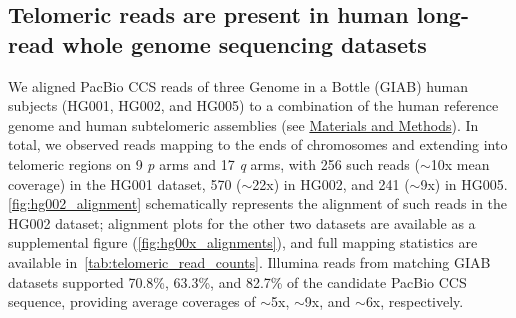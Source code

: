 \documentclass{article}
\begin{document}
\subsection*{Telomeric reads are present in human long-read whole genome sequencing datasets} %
We aligned PacBio CCS reads of three Genome in a Bottle (GIAB) human subjects (HG001, HG002, and HG005) to a combination of the human reference genome and human subtelomeric assemblies (see \hyperref[sec:methods]{Materials and Methods}). %
In total, we observed reads mapping to the ends of chromosomes and extending into telomeric regions on 9 \textit{p} arms and 17 \textit{q} arms, with 256 such reads ($\sim$10x mean coverage) in the HG001 dataset, 570 ($\sim$22x) in HG002, and 241 ($\sim$9x) in HG005.
\autoref{fig:hg002_alignment} schematically represents the alignment of such reads in the HG002 dataset; alignment plots for the other two datasets are available as a supplemental figure (\autoref{fig:hg00x_alignments}), and full mapping statistics are available \mbox{in \autoref{tab:telomeric_read_counts}}. %
Illumina reads from matching GIAB datasets supported 70.8\%, 63.3\%, and 82.7\% of the candidate PacBio CCS sequence, %
providing average coverages of $\sim$5x, $\sim$9x, and $\sim$6x, respectively. %
\end{document}
